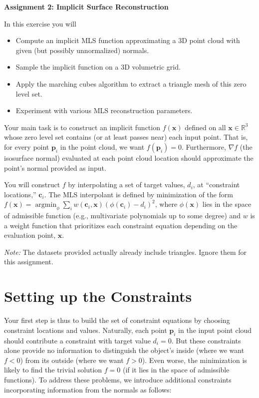 \documentclass[11pt]{amsart}
\renewcommand{\vec}[1]{\mathbf{#1}}
\DeclareMathOperator*{\argmin}{argmin}
\def\x{\vec{x}}
\def\c{\vec{c}}
\def\p{\vec{p}}
\begin{document}
\hspace{50pt}

\begin{center}

{\huge \textbf{Assignment 2: Implicit Surface Reconstruction}}\\
\end{center}

In this exercise you will
\begin{itemize}
\item{Compute an implicit MLS function approximating a 3D point cloud with
    given (but possibly unnormalized) normals.}
\item{Sample the implicit function on a 3D volumetric grid.}
\item{Apply the marching cubes algorithm to extract a triangle mesh of this zero
    level set.}
\item{Experiment with various MLS reconstruction parameters.}
\end{itemize}

Your main task is to construct an implicit function $f(\x)$ defined on all
$\x \in \mathbb{R}^3$ whose zero level set contains (or at least passes near)
each input point. That is, for every point $\p_i$ in the point cloud, we want
$f(\p_i) = 0$. Furthermore, $\nabla f$ (the isosurface normal) evaluated at
each point cloud location should approximate the point's normal provided as
input.

You will construct $f$ by interpolating a set of target values, $d_i$, at
``constraint locations,'' $\c_i$. The MLS interpolant is defined by minimization
of the form $f(\x) = \argmin_\phi \sum_{i} w(\c_i, \x) (\phi(\c_i) -
d_i)^2$, where $\phi(\x)$ lies in the space of admissible function (e.g.,
multivariate polynomials up to some degree) and $w$ is a weight function that
prioritizes each constraint equation depending on the evaluation point, $\x$.

\emph{Note:} The datasets provided actually already include triangles.
Ignore them for this assignment.

\section{Setting up the Constraints}
\label{sec:constraints}
Your first step is thus to build the set of constraint equations by choosing
constraint locations and values. Naturally, each point $\vec{p}_i$ in the input
point cloud should contribute a constraint with target value $d_i = 0$. But
these constraints alone provide no information to distinguish the object's
inside (where we want $f < 0$) from its outside (where we want $f > 0$). Even
worse, the minimization is likely to find the trivial solution $f = 0$ (if it
lies in the space of admissible functions). To address these problems, we
introduce additional constraints incorporating information from the normals as
follows:
\end{document}
